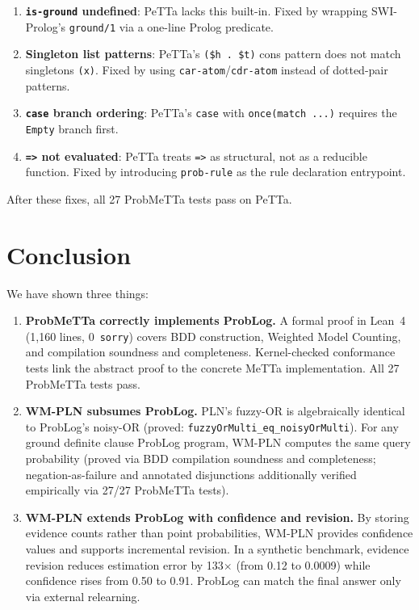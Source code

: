 \documentclass[11pt,a4paper]{article}
\theoremstyle{definition}
\begin{document}
\begin{enumerate}
\item \textbf{\texttt{is-ground} undefined}: PeTTa lacks this built-in.
  Fixed by wrapping SWI-Prolog's \texttt{ground/1} via a one-line Prolog
  predicate.

\item \textbf{Singleton list patterns}: PeTTa's \texttt{(\$h . \$t)} cons
  pattern does not match singletons \texttt{(x)}. Fixed by using
  \texttt{car-atom}/\texttt{cdr-atom} instead of dotted-pair patterns.

\item \textbf{\texttt{case} branch ordering}: PeTTa's \texttt{case} with
  \texttt{once(match ...)} requires the \texttt{Empty} branch first.

\item \textbf{\texttt{=>} not evaluated}: PeTTa treats \texttt{=>} as
  structural, not as a reducible function. Fixed by introducing
  \texttt{prob-rule} as the rule declaration entrypoint.
\end{enumerate}

After these fixes, all 27 ProbMeTTa tests pass on PeTTa.

\section{Conclusion}

We have shown three things:

\begin{enumerate}
\item \textbf{ProbMeTTa correctly implements ProbLog.}
A formal proof in Lean~4 (1{,}160 lines, 0~\texttt{sorry}) covers BDD
construction, Weighted Model Counting, and compilation soundness and
completeness. Kernel-checked conformance tests link the abstract proof
to the concrete MeTTa implementation. All 27 ProbMeTTa tests pass.

\item \textbf{WM-PLN subsumes ProbLog.}
PLN's fuzzy-OR is algebraically identical to ProbLog's noisy-OR
(proved: \texttt{fuzzyOrMulti\_eq\_noisyOrMulti}). For any ground definite
clause ProbLog program, WM-PLN computes the same query probability
(proved via BDD compilation soundness and completeness; negation-as-failure
and annotated disjunctions additionally verified empirically via 27/27
ProbMeTTa tests).

\item \textbf{WM-PLN extends ProbLog with confidence and revision.}
By storing evidence counts rather than point probabilities, WM-PLN
provides confidence values and supports incremental revision.
In a synthetic benchmark, evidence revision reduces estimation error
by 133$\times$ (from 0.12 to 0.0009) while confidence rises from 0.50
to 0.91. ProbLog can match the final answer only via external relearning.
\end{enumerate}
\end{document}
